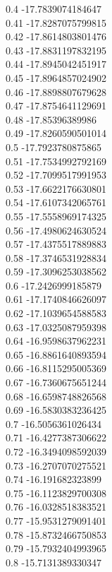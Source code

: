 {0.4	-17.7839074184647\\
0.41	-17.8287075799815\\
0.42	-17.8614803801476\\
0.43	-17.8831197832195\\
0.44	-17.8945042451917\\
0.45	-17.8964857024902\\
0.46	-17.8898807679628\\
0.47	-17.8754641129691\\
0.48	-17.85396389986\\
0.49	-17.8260590501014\\
0.5	-17.7923780875865\\
0.51	-17.7534992792169\\
0.52	-17.7099517991953\\
0.53	-17.6622176630801\\
0.54	-17.6107342065761\\
0.55	-17.5558969174325\\
0.56	-17.4980624630524\\
0.57	-17.4375517889883\\
0.58	-17.3746531928834\\
0.59	-17.3096253038562\\
0.6	-17.2426999185879\\
0.61	-17.1740846626097\\
0.62	-17.1039654588583\\
0.63	-17.0325087959398\\
0.64	-16.9598637962231\\
0.65	-16.8861640893594\\
0.66	-16.8115295005369\\
0.67	-16.7360675651244\\
0.68	-16.6598748826568\\
0.69	-16.5830383236425\\
0.7	-16.5056361026434\\
0.71	-16.4277387306622\\
0.72	-16.3494098592039\\
0.73	-16.2707070275521\\
0.74	-16.191682323899\\
0.75	-16.1123829700308\\
0.76	-16.0328518383521\\
0.77	-15.9531279091401\\
0.78	-15.8732466750853\\
0.79	-15.7932404993965\\
0.8	-15.7131389330347\\
}
